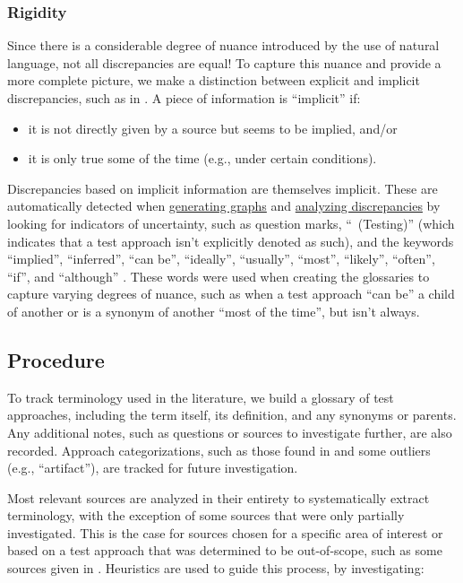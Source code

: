 \subsubsection{Rigidity}
\label{rigidity}

Since there is a considerable degree of nuance introduced by the use of natural
language, not all discrepancies are equal! To capture this nuance and provide a
more complete picture, we make a distinction between explicit and implicit
discrepancies, such as in . A piece of information is
``implicit'' if:
\begin{itemize}
    \item it is not directly given by a source but seems to be implied, and/or
    \item it is only true some of the time (e.g., under certain conditions).
\end{itemize}
Discrepancies based on implicit information are themselves implicit. These are
automatically detected when \hyperref[graph-gen]{generating graphs} and
\hyperref[discrep-analysis]{analyzing discrepancies} by looking for indicators
of uncertainty, such as question marks, ``~(Testing)'' (which indicates
that a test approach isn't explicitly denoted as such), and the keywords
``implied'', ``inferred'', ``can be'', ``ideally'', ``usually'', ``most'',
``likely'', ``often'', ``if'', and ``although''
. These words were used when creating
the glossaries to capture varying degrees of nuance, such as when a test
approach ``can be'' a child of another or is a synonym of another ``most of the
time'', but isn't always.

\subsection{Procedure}

To track terminology used in the literature, we build a glossary of test
approaches, including the term itself, its definition, and
any synonyms or parents. Any additional notes, such as questions or sources to investigate
further, are also recorded. Approach categorizations, such as those found in
 and some outliers (e.g., ``artifact''), are tracked
for future investigation.

Most relevant sources are analyzed in their entirety to systematically extract
terminology, with the exception of some sources that were only partially
investigated. This is the case for sources chosen for a specific area of
interest or based on a test approach that was determined to be out-of-scope,
such as some sources given in .
Heuristics are used to guide this process, by investigating:

